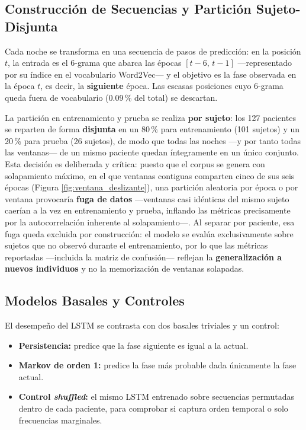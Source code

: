 \subsection{Construcción de Secuencias y Partición Sujeto-Disjunta}

Cada noche se transforma en una secuencia de pasos de predicción: en la posición $t$, la entrada es el 6-grama que abarca las épocas $[t-6,\,t-1]$ ---representado por su índice en el vocabulario Word2Vec--- y el objetivo es la fase observada en la época $t$, es decir, la \textbf{siguiente} época. Las escasas posiciones cuyo 6-grama queda fuera de vocabulario (0.09\,\% del total) se descartan.

La partición en entrenamiento y prueba se realiza \textbf{por sujeto}: los 127 pacientes se reparten de forma \textbf{disjunta} en un 80\,\% para entrenamiento (101 sujetos) y un 20\,\% para prueba (26 sujetos), de modo que todas las noches ---y por tanto todas las ventanas--- de un mismo paciente quedan íntegramente en un único conjunto. Esta decisión es deliberada y crítica: puesto que el corpus se genera con solapamiento máximo, en el que ventanas contiguas comparten cinco de sus seis épocas (Figura \ref{fig:ventana_deslizante}), una partición aleatoria por época o por ventana provocaría \textbf{fuga de datos} ---ventanas casi idénticas del mismo sujeto caerían a la vez en entrenamiento y prueba, inflando las métricas precisamente por la autocorrelación inherente al solapamiento---. Al separar por paciente, esa fuga queda excluida por construcción: el modelo se evalúa exclusivamente sobre sujetos que no observó durante el entrenamiento, por lo que las métricas reportadas ---incluida la matriz de confusión--- reflejan la \textbf{generalización a nuevos individuos} y no la memorización de ventanas solapadas.

\subsection{Modelos Basales y Controles}

El desempeño del LSTM se contrasta con dos basales triviales y un control:

\begin{itemize}
    \item \textbf{Persistencia:} predice que la fase siguiente es igual a la actual.
    \item \textbf{Markov de orden 1:} predice la fase más probable dada únicamente la fase actual.
    \item \textbf{Control \textit{shuffled}:} el mismo LSTM entrenado sobre secuencias permutadas dentro de cada paciente, para comprobar si captura orden temporal o solo frecuencias marginales.
\end{itemize}

